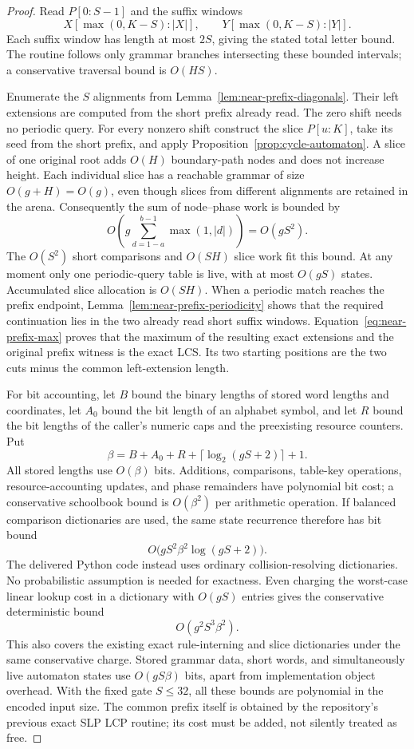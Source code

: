 \documentclass[11pt]{article}
\theoremstyle{definition}
\theoremstyle{remark}
\begin{document}
\begin{proof}
Read $P[0:S-1]$ and the suffix windows
\[
 X[\max(0,K-S):|X|],\qquad
 Y[\max(0,K-S):|Y|].
\]
Each suffix window has length at most $2S$, giving the stated total
letter bound. The routine follows only grammar branches intersecting
these bounded intervals; a conservative traversal bound is $O(HS)$.

Enumerate the $S$ alignments from Lemma~\ref{lem:near-prefix-diagonals}.
Their left extensions are computed from the short prefix already read.
The zero shift needs no periodic query. For every nonzero shift construct
the slice $P[u:K]$, take its seed from the short prefix, and apply
Proposition~\ref{prop:cycle-automaton}. A slice of one original root adds
$O(H)$ boundary-path nodes and does not increase height. Each individual
slice has a reachable grammar of size $O(g+H)=O(g)$, even though slices
from different alignments are retained in the arena. Consequently the
sum of node--phase work is bounded by
\[
 O\!\left(g\sum_{d=1-a}^{b-1}\max(1,|d|)\right)=O(gS^2).
\]
The $O(S^2)$ short comparisons and $O(SH)$ slice work fit this bound.
At any moment only one periodic-query table is live, with at most
$O(gS)$ states. Accumulated slice allocation is $O(SH)$. When a periodic
match reaches the prefix endpoint, Lemma~\ref{lem:near-prefix-periodicity}
shows that the required continuation lies in the two already read short
suffix windows. Equation~\eqref{eq:near-prefix-max} proves that the maximum
of the resulting exact extensions and the original prefix witness is the
exact LCS. Its two starting positions are the two cuts minus the common
left-extension length.

For bit accounting, let $B$ bound the binary lengths of stored word
lengths and coordinates, let $A_0$ bound the bit length of an alphabet
symbol, and let $R$ bound the bit lengths of the caller's numeric caps
and the preexisting resource counters. Put
\[
 \beta=B+A_0+R+\lceil\log_2(gS+2)\rceil+1.
\]
All stored lengths use $O(\beta)$ bits. Additions, comparisons, table-key
operations, resource-accounting updates, and phase remainders have
polynomial bit cost; a conservative
schoolbook bound is $O(\beta^2)$ per arithmetic operation. If balanced
comparison dictionaries are used, the same state recurrence therefore
has bit bound
\[
 O\bigl(gS^2\beta^2\log(gS+2)\bigr).
\]
The delivered Python code instead uses ordinary collision-resolving
dictionaries. No probabilistic assumption is needed for exactness. Even
charging the worst-case linear lookup cost in a dictionary with
$O(gS)$ entries gives the conservative deterministic bound
\[
 O(g^2S^3\beta^2).
\]
This also covers the existing exact rule-interning and slice dictionaries
under the same conservative charge. Stored grammar data, short words,
and simultaneously live automaton states use $O(gS\beta)$ bits, apart
from implementation object overhead. With the fixed gate $S\le32$,
all these bounds are polynomial in the encoded input size. The common
prefix itself is obtained by the repository's previous exact SLP LCP
routine; its cost must be added, not silently treated as free.
\end{proof}
\end{document}
